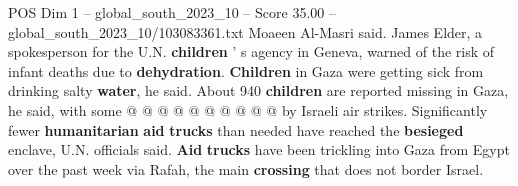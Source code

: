 \begin{textsample}{POS Dim 1 – global\_south\_2023\_10 – Score 35.00 – global\_south\_2023\_10/103083361.txt}
Moaeen Al-Masri said.
James Elder, a spokesperson for the U.N. \textbf{children} ' s agency in Geneva, warned of the risk of infant deaths due to \textbf{dehydration}. \textbf{Children} in Gaza were getting sick from drinking salty \textbf{water}, he said.
About 940 \textbf{children} are reported missing in Gaza, he said, with some @ @ @ @ @ @ @ @ @ @ by Israeli air strikes.
Significantly fewer \textbf{humanitarian} \textbf{aid} \textbf{trucks} than needed have reached the \textbf{besieged} enclave, U.N. officials said. \textbf{Aid} \textbf{trucks} have been trickling into Gaza from Egypt over the past week via Rafah, the main \textbf{crossing} that does not border Israel.

\end{textsample}
